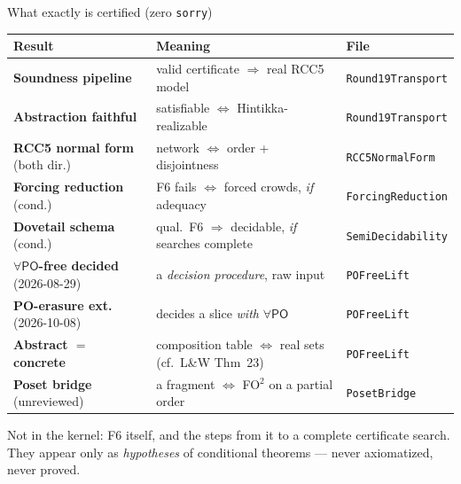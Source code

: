 \documentclass[aspectratio=169,11pt]{beamer}
\newcommand{\PO}{\mathsf{PO}}
\begin{document}
\begin{frame}{What exactly is certified (zero \texttt{sorry})}
\begin{center}
\scriptsize
\begin{tabular}{lll}
\toprule
Result & Meaning & File\\
\midrule
\textcolor{good}{\textbf{Soundness pipeline}} &
  valid certificate $\Rightarrow$ real RCC5 model &
  \texttt{Round19Transport}\\
\textcolor{good}{\textbf{Abstraction faithful}} &
  satisfiable $\Leftrightarrow$ Hintikka-realizable &
  \texttt{Round19Transport}\\
\textcolor{good}{\textbf{RCC5 normal form}} (both dir.) &
  network $\Leftrightarrow$ order + disjointness &
  \texttt{RCC5NormalForm}\\
\textcolor{openc}{\textbf{Forcing reduction}} (cond.) &
  F6 fails $\Leftrightarrow$ forced crowds, \emph{if} adequacy &
  \texttt{ForcingReduction}\\
\textcolor{openc}{\textbf{Dovetail schema}} (cond.) &
  qual.\ F6 $\Rightarrow$ decidable, \emph{if} searches complete &
  \texttt{SemiDecidability}\\
\midrule
\textcolor{good}{\textbf{$\forall\PO$-free decided}} \tiny(2026-08-29) &
  \normalsize a \emph{decision procedure}, raw input &
  \texttt{POFreeLift}\\
\textcolor{good}{\textbf{PO-erasure ext.}} \tiny(2026-10-08) &
  \normalsize decides a slice \emph{with} $\forall\PO$ &
  \texttt{POFreeLift}\\
\textcolor{good}{\textbf{Abstract $=$ concrete}} &
  composition table $\Leftrightarrow$ real sets (cf.\ L\&W Thm~23) &
  \texttt{POFreeLift}\\
\textcolor{good}{\textbf{Poset bridge}} \tiny(unreviewed) &
  \normalsize a fragment $\Leftrightarrow$ FO$^2$ on a partial order &
  \texttt{PosetBridge}\\
\bottomrule
\end{tabular}
\end{center}
\vfill
\alert{Not} in the kernel: F6 itself, and the steps from it to a complete
certificate search. They appear only as \emph{hypotheses} of conditional
theorems --- never axiomatized, never proved.
\end{frame}
\end{document}
